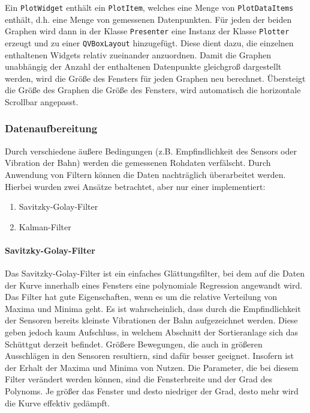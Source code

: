 Ein \texttt{PlotWidget} enthält ein \texttt{PlotItem}, welches eine Menge von \texttt{PlotDataItems} enthält, d.h. eine Menge von gemessenen Datenpunkten.
Für jeden der beiden Graphen wird dann in der Klasse \texttt{Presenter} eine Instanz der Klasse \texttt{Plotter} erzeugt und zu einer \texttt{QVBoxLayout} hinzugefügt. Diese dient dazu, die einzelnen enthaltenen Widgets relativ zueinander anzuordnen.
Damit die Graphen unabhängig der Anzahl der enthaltenen Datenpunkte gleichgroß dargestellt werden, wird die Größe des Fensters für jeden Graphen neu berechnet. Übersteigt die Größe des Graphen die Größe des Fensters, wird automatisch die horizontale Scrollbar angepasst.
\subsubsection{Datenaufbereitung}
Durch verschiedene äußere Bedingungen (z.B. Empfindlichkeit des Sensors oder Vibration der Bahn) werden die gemessenen Rohdaten verfälscht. Durch Anwendung von Filtern können die Daten nachträglich überarbeitet werden.
Hierbei wurden zwei Ansätze betrachtet, aber nur einer implementiert:
\begin{enumerate}
\item Savitzky-Golay-Filter
\item Kalman-Filter
\end{enumerate}
\paragraph{Savitzky-Golay-Filter}
Das Savitzky-Golay-Filter ist ein einfaches Glättungsfilter, bei dem auf die Daten der Kurve innerhalb eines Fensters eine polynomiale Regression angewandt wird. Das Filter hat gute Eigenschaften, wenn es um die relative Verteilung von Maxima und Minima geht. Es ist wahrscheinlich, dass durch die Empfindlichkeit der Sensoren bereits kleinste Vibrationen der Bahn aufgezeichnet werden. Diese geben jedoch kaum Aufschluss, in welchem Abschnitt der Sortieranlage sich das Schüttgut derzeit befindet. Größere Bewegungen, die auch in größeren Ausschlägen in den Sensoren resultiern, sind dafür besser geeignet. Insofern ist der Erhalt der Maxima und Minima von Nutzen.
Die Parameter, die bei diesem Filter verändert werden können, sind die Fensterbreite und der Grad des Polynoms. Je größer das Fenster und desto niedriger der Grad, desto mehr wird die Kurve effektiv gedämpft.

